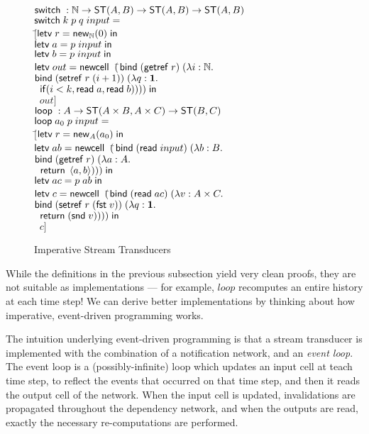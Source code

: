 \begin{figure}
\begin{tabbing}
$\mathsf{switch}\; : \mathbb{N} \to \mathsf{ST}({A}, {B}) \to \mathsf{ST}({A}, {B}) \to \mathsf{ST}({A}, {B})$ \\
$\mathsf{switch}\; k\;p\;q\; input =  $ \\
\;\;$[$\=$\mathsf{letv}\;r = \mathsf{new}_{\mathbb{N}}(0)\;\mathsf{in}\;$ \\
    \>$\letv{a}{p\;input}$ \\
    \>$\letv{b}{p\;input}$ \\
    \>$\mathsf{letv}\; out = \mathsf{newcell}\;\; ($\=$\mathsf{bind}\; (\mathsf{getref}\; r) \;(\lambda i:\mathbb{N}.\;$ \\
    \>                                 \>$\mathsf{bind}\; (\mathsf{setref}\; r\;(i+1)) \; (\lambda q:\mathbf{1}.$ \\
    \>                                 \>$\;\;\mathsf{if}(i < k, \mathsf{read}\; a, \mathsf{read}\; b)))) \;\mathsf{in}$ \\
    \>$\;\;out]$\\[1em]

$\mathsf{loop}\; : A \to \mathsf{ST}({A\times B}, {A\times C}) \to \mathsf{ST}({B}, {C})$ \\
$\mathsf{loop}\; a_0\; p \; input = $ \\
\;\;$[$\=$\mathsf{letv}\;r = \mathsf{new}_{A}(a_0)\;\mathsf{in}\;$ \\
    \>$\mathsf{letv}\; ab = \mathsf{newcell}\;\; ($\=$\mathsf{bind}\; (\mathsf{read}\; input)\; (\lambda b:B.$ \\
    \>                                \>$\mathsf{bind}\; (\mathsf{getref}\; r)\;       (\lambda a:A.$ \\
    \>                                \>$\;\; \mathsf{return}\; \left<{a},{b}\right>))) \;\mathsf{in}$ \\
    \>$\mathsf{letv}\;ac = p\;ab\;\mathsf{in}\;$ \\
    \>$\mathsf{letv}\;c = \mathsf{newcell}\;\; ($\=$\mathsf{bind}\; (\mathsf{read}\; ac) \;(\lambda v:A \times C.$ \\
    \>                              \>$\mathsf{bind}\; (\mathsf{setref}\; r\;(\mathsf{fst}\; v)) \;(\lambda q:\mathbf{1}.$ \\
    \>                              \>$\;\;\mathsf{return}\; (\mathsf{snd}\; v))))\;\mathsf{in}$ \\
    \>$\;\;c]$ 
\end{tabbing}
\caption{Imperative Stream Transducers}
\label{imperative-transducer-semantics}
\end{figure}

While the definitions in the previous subsection yield very clean
proofs, they are not suitable as implementations --- for example,
$loop$ recomputes an entire history at each time step! We can derive
better implementations by thinking about how imperative, event-driven
programming works.

The intuition underlying event-driven programming is that a stream
transducer is implemented with the combination of a notification
network, and an \emph{event loop}.  The event loop is a
(possibly-infinite) loop which updates an input cell at teach time
step, to reflect the events that occurred on that time step, and then
it reads the output cell of the network. When the input cell is
updated, invalidations are propagated throughout the dependency
network, and when the outputs are read, exactly the necessary
re-computations are performed.

